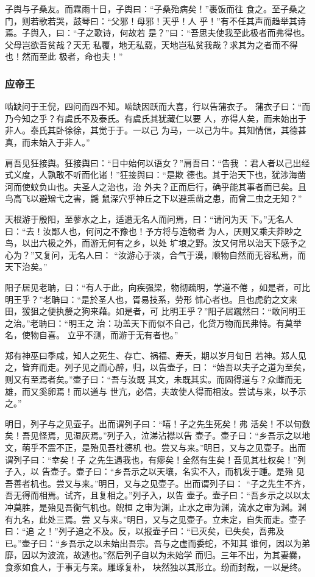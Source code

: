 \documentclass[]{article}
\begin{document}
子舆与子桑友。而霖雨十日，子舆曰：``子桑殆病矣！''裹饭而往
食之。至子桑之门，则若歌若哭，鼓琴曰：``父邪！母邪！天乎！人
乎！''有不任其声而趋举其诗焉。子舆入，曰：``子之歌诗，何故若
是？''曰：``吾思夫使我至此极者而弗得也。父母岂欲吾贫哉？天无
私覆，地无私载，天地岂私贫我哉？求其为之者而不得也！然而至此
极者，命也夫！''

\hypertarget{header-n667}{%
\subsubsection{应帝王}\label{header-n667}}

啮缺问于王倪，四问而四不知。啮缺因跃而大喜，行以告蒲衣子。
蒲衣子曰：``而乃今知之乎？有虞氏不及泰氏。有虞氏其犹藏仁以要
人，亦得人矣，而未始出于非人。泰氏其卧徐徐，其觉于于。一以己
为马，一以己为牛。其知情信，其德甚真，而未始入于非人。''

肩吾见狂接舆。狂接舆曰：``日中始何以语女？''肩吾曰：``告我
：君人者以己出经式义度，人孰敢不听而化诸！''狂接舆曰：``是欺
德也。其于治天下也，犹涉海凿河而使蚊负山也。夫圣人之治也，治
外夫？正而后行，确乎能其事者而已矣。且鸟高飞以避矰弋之害，鼷
鼠深穴乎神丘之下以避熏凿之患，而曾二虫之无知？''

天根游于殷阳，至蓼水之上，适遭无名人而问焉，曰：``请问为天
下。''无名人曰：``去！汝鄙人也，何问之不豫也！予方将与造物者
为人，厌则又乘夫莽眇之鸟，以出六极之外，而游无何有之乡，以处
圹埌之野。汝又何帛以治天下感予之心为？''又复问，无名人曰：
``汝游心于淡，合气于漠，顺物自然而无容私焉，而天下治矣。''

阳子居见老聃，曰：``有人于此，向疾强梁，物彻疏明，学道不倦
，如是者，可比明王乎？''老聃曰：``是於圣人也，胥易技系，劳形
怵心者也。且也虎豹之文来田，猨狙之便执嫠之狗来藉。如是者，可
比明王乎？''阳子居蹴然曰：``敢问明王之治。''老聃曰：``明王之
治：功盖天下而似不自己，化贷万物而民弗恃。有莫举名，使物自喜。
立乎不测，而游于无有者也。''

郑有神巫曰季咸，知人之死生、存亡、祸福、寿夭，期以岁月旬日
若神。郑人见之，皆弃而走。列子见之而心醉，归，以告壶子，曰：
``始吾以夫子之道为至矣，则又有至焉者矣。''壶子曰：``吾与汝既
其文，未既其实。而固得道与？众雌而无雄，而又奚卵焉！而以道与
世亢，必信，夫故使人得而相汝。尝试与来，以予示之。''

明日，列子与之见壶子。出而谓列子曰：``嘻！子之先生死矣！弗
活矣！不以旬数矣！吾见怪焉，见湿灰焉。''列子入，泣涕沾襟以告
壶子。壶子曰：``乡吾示之以地文，萌乎不震不正，是殆见吾杜德机
也。尝又与来。''明日，又与之见壶子。出而谓列子曰：``幸矣！子
之先生遇我也，有瘳矣！全然有生矣！吾见其杜权矣！''列子入，以
告壶子。壶子曰：``乡吾示之以天壤，名实不入，而机发于踵。是殆
见吾善者机也。尝又与来。''明日，又与之见壶子。出而谓列子曰：
``子之先生不齐，吾无得而相焉。试齐，且复相之。''列子入，以告
壶子。壶子曰：``吾乡示之以以太冲莫胜，是殆见吾衡气机也。鲵桓
之审为渊，止水之审为渊，流水之审为渊。渊有九名，此处三焉。尝
又与来。''明日，又与之见壶子。立未定，自失而走。壶子曰：``追
之！''列子追之不及。反，以报壶子曰：``已灭矣，已失矣，吾弗及
已。''壶子曰：``乡吾示之以未始出吾宗。吾与之虚而委蛇，不知其
谁何，因以为弟靡，因以为波流，故逃也。''然后列子自以为未始学
而归。三年不出，为其妻爨，食豕如食人，于事无与亲。雕琢复朴，
块然独以其形立。纷而封哉，一以是终。
\end{document}
